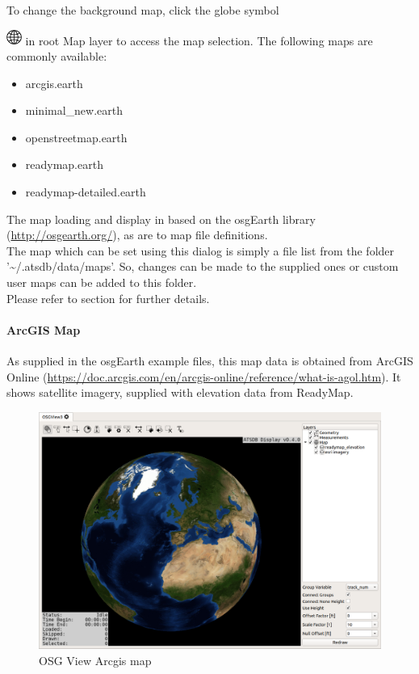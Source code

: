 To change the background map, click the globe symbol {\includegraphics[width=0.5cm]{../../data/icons/globe.png} in root Map layer to access the map selection. The following maps are commonly available:

\begin{itemize}
 \item arcgis.earth
 \item minimal\_new.earth
 \item openstreetmap.earth
 \item readymap.earth
 \item readymap-detailed.earth
\end{itemize}

The map loading and display in based on the osgEarth library (\url{http://osgearth.org/}), as are to map file definitions.  \\

The map which can be set using this dialog is simply a file list from the folder '\textasciitilde/.atsdb/data/maps'. So, changes can be made to the supplied ones or custom user maps can be added to this folder. \\
Please refer to section  for further details.

\newpage
\paragraph{ArcGIS Map}

As supplied in the osgEarth example files, this map data is obtained from ArcGIS Online (\url{https://doc.arcgis.com/en/arcgis-online/reference/what-is-agol.htm}). It shows satellite imagery, supplied with elevation data from ReadyMap. 

\begin{figure}[H]
    \hspace*{-2cm}
    \includegraphics[width=18cm,frame]{../screenshots/osgview_arcgis.png}
  \caption{OSG View Arcgis map}
\end{figure}

}
